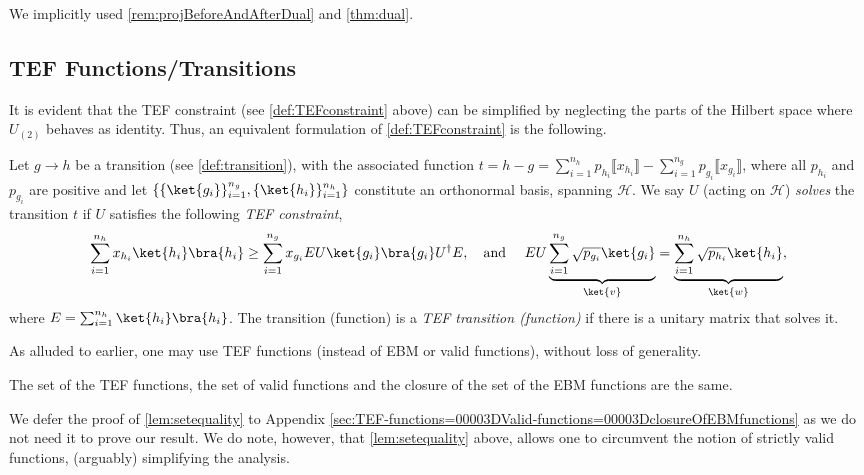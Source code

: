 \documentclass{article}
\begin{document}
We implicitly used \cref{rem:projBeforeAndAfterDual} and  %
\cref{thm:dual}.

\subsection{TEF Functions/Transitions}\label{subsec:TEFfunctions}
%

It is evident that the TEF constraint (see \cref{def:TEFconstraint} above) can be simplified by neglecting the parts of the Hilbert space where $U_{(2)}$ behaves as identity. Thus, an equivalent formulation of \cref{def:TEFconstraint} is the following.

%

\begin{definition}\label{def:TEFconstraint_} Let $g\to h$ be a transition (see \cref{def:transition}), with the associated function $ t= h - g = \sum_{i=1}^{n_h} p_{h_i} \llbracket{x_{h_i}}\rrbracket - \sum_{i=1}^{n_g} p_{g_i} \llbracket{x_{g_i}}\rrbracket$,
  where all $p_{h_i}$ and $p_{g_i}$ are positive and let $\{\{\ket{g_i}\}_{i=1}^{n_g},\{\ket{h_i}\}_{i=1}^{n_h}\}$ constitute an orthonormal basis, spanning $\mathcal{H}$. We say $U$ (acting on $\mathcal{H}$) \emph{solves} the transition $t$ if $U$ satisfies the following \emph{TEF constraint},
  $$\sum_{i=1}^{n_h} x_{h_i} \ket{h_i}\bra{h_i} \ge \sum_{i=1}^{n_g} x_{g_i} E U \ket{g_i}\bra{g_i} U^{\dagger} E, \quad \text{and } \quad EU\underbrace{\sum_{i=1}^{n_g} \sqrt{p_{g_i}} \ket {g_i}}_{\ket{v}} = \underbrace{\sum_{i=1}^{n_h} \sqrt{p_{h_i}} \ket{h_i}}_{\ket{w}},$$
  where $E = \sum_{i=1}^{n_h} \ket{h_i}\bra{h_i}$.
  The transition (function) is a \emph{TEF transition (function)} if there is a unitary matrix that solves it. %

\end{definition}


%
%
%
%
%
%
%
%
%
%
%
%
%
%
%
%
%
%
%
%
%
%
%
%
%
%
%
%

As alluded to earlier, one may use TEF functions (instead of EBM or valid functions), without loss of generality.
%
%
%
%
%
%
%
\begin{lemma}[TEF = closure of EBM = valid]
  The set of the TEF functions, the set of valid functions
  and the closure of the set of the EBM functions
  are the same. \label{lem:setequality}
\end{lemma}

%
We defer the proof of \cref{lem:setequality} to Appendix \ref{sec:TEF-functions=00003DValid-functions=00003DclosureOfEBMfunctions} as we do not need it to prove our result.
We do note, however, that \cref{lem:setequality} above, allows one to circumvent the notion of strictly valid functions, (arguably) simplifying the analysis.
%
%
\end{document}
